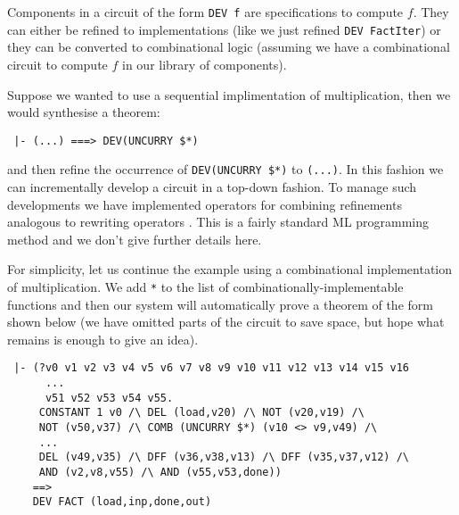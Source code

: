 Components in a
circuit of the form \texttt{DEV~f} are specifications to compute
$f$. They can either be refined to implementations (like we just
refined \texttt{DEV~FactIter}) or they can be converted to
combinational logic (assuming we have a combinational circuit to
compute $f$ in our library of components).

Suppose we wanted to use a sequential implimentation of multiplication,
then we would synthesise a theorem:

\vspace*{-2mm}

{\baselineskip10pt\begin{verbatim}
 |- (...) ===> DEV(UNCURRY $*)
\end{verbatim}}

\vspace*{-2mm}

\noindent and then refine the occurrence of \texttt{DEV(UNCURRY~\$*)}
to \texttt{(...)}.  In this fashion we can incrementally develop a
circuit in a top-down fashion. To manage such developments we have
implemented operators for combining refinements analogous to rewriting
operators \cite{Paulson}. This is a fairly standard ML programming
method and we don't give further details here.

For simplicity, let us continue the example using a combinational
implementation of multiplication. We add \texttt{*} to the list of
combinationally-implementable functions and then our system will
automatically prove a theorem of the form shown below (we have omitted
parts of the circuit to save space, but hope what remains is enough to
give an idea).

\vspace*{-2mm}

{\baselineskip10pt\begin{verbatim}
 |- (?v0 v1 v2 v3 v4 v5 v6 v7 v8 v9 v10 v11 v12 v13 v14 v15 v16
      ...
      v51 v52 v53 v54 v55.
     CONSTANT 1 v0 /\ DEL (load,v20) /\ NOT (v20,v19) /\
     NOT (v50,v37) /\ COMB (UNCURRY $*) (v10 <> v9,v49) /\
     ...
     DEL (v49,v35) /\ DFF (v36,v38,v13) /\ DFF (v35,v37,v12) /\
     AND (v2,v8,v55) /\ AND (v55,v53,done)) 
    ==> 
    DEV FACT (load,inp,done,out) 
\end{verbatim}}

\vspace*{-2mm}

